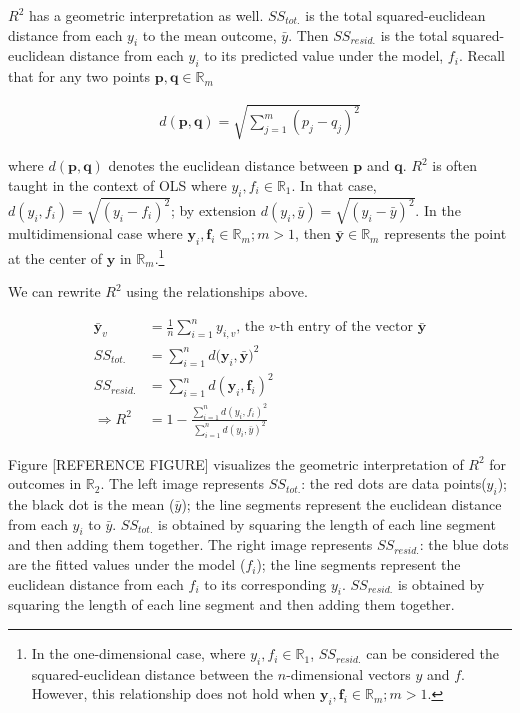 \documentclass[conference,final,]{IEEEtran}
\begin{document}
\(R^2\) has a geometric interpretation as well. \(SS_{tot.}\) is the
total squared-euclidean distance from each \(y_i\) to the mean outcome,
\(\bar{y}\). Then \(SS_{resid.}\) is the total squared-euclidean
distance from each \(y_i\) to its predicted value under the model,
\(f_i\). Recall that for any two points
\(\mathbf{p}, \mathbf{q} \in \mathbb{R}_m\)

\begin{align}
    d(\mathbf{p},\mathbf{q}) = \sqrt{\sum_{j=1}^m{(p_j - q_j)^2}}
\end{align}

where \(d(\mathbf{p}, \mathbf{q})\) denotes the euclidean distance
between \(\mathbf{p}\) and \(\mathbf{q}\). \(R^2\) is often taught in
the context of OLS where \(y_i, f_i \in \mathbb{R}_1\). In that case,
\(d(y_i, f_i) = \sqrt{(y_i - f_i)^2}\); by extension
\(d(y_i, \bar{y}) = \sqrt{(y_i - \bar{y})^2}\). In the multidimensional
case where \(\mathbf{y}_i, \mathbf{f}_i \in \mathbb{R}_m; m > 1\), then
\(\bar{\mathbf{y}} \in \mathbb{R}_m\) represents the point at the center
of \(\mathbf{y}\) in \(\mathbb{R}_m\).\footnote{In the one-dimensional
  case, where \(y_i , f_i \in \mathbb{R}_1\), \(SS_{resid.}\) can be
  considered the squared-euclidean distance between the
  \(n\)-dimensional vectors \(y\) and \(f\). However, this relationship
  does not hold when
  \(\mathbf{y}_i , \mathbf{f}_i \in \mathbb{R}_m ; m > 1\).}

We can rewrite \(R^2\) using the relationships above.

\begin{align}
    \bar{\mathbf{y}}_v &= \frac{1}{n} \sum_{i=1}^{n} y_{i,v} 
      \text{, the $v$-th entry of the vector $\bar{\mathbf{y}}$} \\ 
    SS_{tot.} &= \sum_{i=1}^n{d(\mathbf{y}_i, \bar{\mathbf{y}}})^2\\
    SS_{resid.} &= \sum_{i=1}^n{d(\mathbf{y}_i, \mathbf{f}_i)^2}\\
    \Rightarrow R^2 &= 1 - \frac{\sum_{i=1}^n{d(y_i, f_i)^2}}{\sum_{i=1}^n{d(y_i, \bar{y})^2}}
\end{align}

Figure {[}REFERENCE FIGURE{]} visualizes the geometric interpretation of
\(R^2\) for outcomes in \(\mathbb{R}_2\). The left image represents
\(SS_{tot.}\): the red dots are data points(\(y_i\)); the black dot is
the mean (\(\bar{y}\)); the line segments represent the euclidean
distance from each \(y_i\) to \(\bar{y}\). \(SS_{tot.}\) is obtained by
squaring the length of each line segment and then adding them together.
The right image represents \(SS_{resid.}\): the blue dots are the fitted
values under the model (\(f_i\)); the line segments represent the
euclidean distance from each \(f_i\) to its corresponding \(y_i\).
\(SS_{resid.}\) is obtained by squaring the length of each line segment
and then adding them together.
\end{document}
